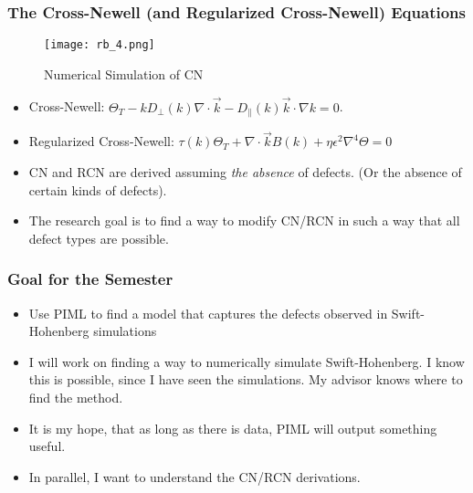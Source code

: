 \documentclass[]{beamer}
\begin{document}
\begin{frame}
    \frametitle{The Cross-Newell (and Regularized Cross-Newell) Equations}
        \begin{figure}
        \centering
        \texttt{[image: rb\_4.png]}
        \caption{Numerical Simulation of CN}
        \end{figure}
\begin{itemize}
      \item Cross-Newell: $\Theta_T - kD_{\perp}(k)\nabla \cdot \vec{k} - D_{\parallel}(k)\vec{k}\cdot \nabla k=0$.
      \item Regularized Cross-Newell: $\tau(k)\Theta_T + \nabla \cdot \vec{k}B(k)+\eta \epsilon^2\nabla^4\Theta = 0$
      \item CN and RCN are derived assuming \emph{the absence} of defects. (Or the absence of certain kinds of defects).
    \item The research goal is to find a way to modify CN/RCN in such a way that all defect types are possible.
\end{itemize}
\end{frame}

\begin{frame}
    \frametitle{Goal for the Semester}
    \begin{itemize}
        \item Use PIML to find a model that captures the defects observed in Swift-Hohenberg simulations
        \item I will work on finding a way to numerically simulate Swift-Hohenberg. I know this is possible, since I have seen the simulations. My advisor knows where to find the method.
        \item It is my hope, that as long as there is data, PIML will output something useful.
        \item In parallel, I want to understand the CN/RCN derivations.
    \end{itemize}
\end{frame}
\end{document}
